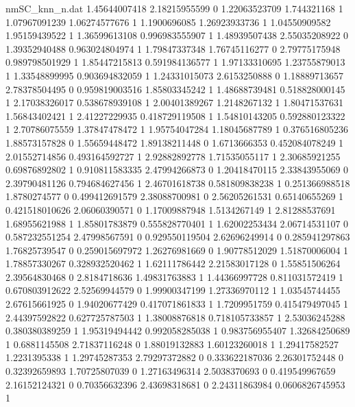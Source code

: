 \begin{filecontents}{nmSC_knn_n.dat}
1.45644007418 2.18215955599 0
1.22063523709 1.744321168 1
1.07967091239 1.06274577676 1
1.1900696085 1.26923933736 1
1.04550909582 1.95159439522 1
1.36599613108 0.996983555907 1
1.48939507438 2.55035208922 0
1.39352940488 0.963024804974 1
1.79847337348 1.76745116277 0
2.79775175948 0.989798501929 1
1.85447215813 0.591984136577 1
1.97133310695 1.23755879013 1
1.33548899995 0.903694832059 1
1.24331015073 2.6153250888 0
1.18889713657 2.78378504495 0
0.959819003516 1.85803345242 1
1.48688739481 0.518828000145 1
2.17038326017 0.538678939108 1
2.00401389267 1.2148267132 1
1.80471537631 1.56843402421 1
2.41227229935 0.418729119508 1
1.54810143205 0.592880123322 1
2.70786075559 1.37847478472 1
1.95754047284 1.18045687789 1
0.376516805236 1.88573157828 0
1.55659448472 1.89138211448 0
1.6713666353 0.452084078249 1
2.01552714856 0.493164592727 1
2.92882892778 1.71535055117 1
2.30685921255 0.69876892802 1
0.910811583335 2.47994266873 0
1.20418470115 2.33843955069 0
2.39790481126 0.794684627456 1
2.46701618738 0.581809838238 1
0.251366988518 1.8780274577 0
0.499412691579 2.38088700981 0
2.56205261531 0.65140655269 1
0.421518010626 2.06060390571 0
1.17009887948 1.5134267149 1
2.81288537691 1.68955621988 1
1.85801783879 0.555828770401 1
1.62002253434 2.06714531107 0
0.587232551254 2.47998567591 0
0.929550119504 2.62696249914 0
0.285941297863 1.76825739547 0
0.259015697972 1.26276981669 0
1.90778512029 1.51870006004 1
1.78857330267 0.328932520462 1
1.62111786442 2.21583017128 0
1.55851506264 2.39564830468 0
2.8184718636 1.49831763883 1
1.44366997728 0.811031572419 1
0.670803912622 2.52569944579 0
1.99900347199 1.27336970112 1
1.03545744455 2.67615661925 0
1.94020677429 0.417071861833 1
1.7209951759 0.415479497045 1
2.44397592822 0.627725787503 1
1.38008876818 0.718105733857 1
2.53036245288 0.380380389259 1
1.95319494442 0.992058285038 1
0.983756955407 1.32684250689 1
0.6881145508 2.71837116248 0
1.88019132883 1.60123260018 1
1.29417582527 1.2231395338 1
1.29745287353 2.79297372882 0
0.333622187036 2.26301752448 0
0.32392659893 1.70725807039 0
1.27163496314 2.5038370693 0
0.419549967659 2.16152124321 0
0.70356632396 2.43698318681 0
2.24311863984 0.0606826745953 1
\end{filecontents}
